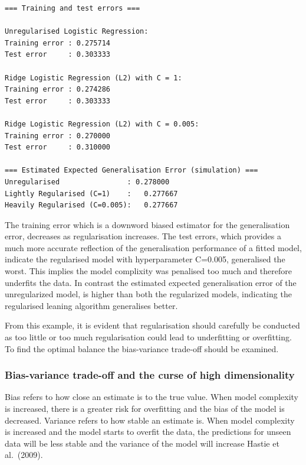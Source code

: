 \documentclass[11pt]{article}
\begin{document}
    \begin{Verbatim}[commandchars=\\\{\}]
=== Training and test errors ===

Unregularised Logistic Regression:
Training error : 0.275714
Test error     : 0.303333

Ridge Logistic Regression (L2) with C = 1:
Training error : 0.274286
Test error     : 0.303333

Ridge Logistic Regression (L2) with C = 0.005:
Training error : 0.270000
Test error     : 0.310000

=== Estimated Expected Generalisation Error (simulation) ===
Unregularised                : 0.278000
Lightly Regularised (C=1)    :   0.277667
Heavily Regularised (C=0.005):   0.277667
    \end{Verbatim}

    The training error which is a downword biased estimator for the
generalisation error, decreases as regularisation increases. The test
errors, which provides a much more accurate reflection of the
generalisation performance of a fitted model, indicate the regularised
model with hyperparameter C=0.005, generalised the worst. This implies
the model complixity was penalised too much and therefore underfits the
data. In contrast the estimated expected generalisation error of the
unregularized model, is higher than both the regularized models,
indicating the regularised leaning algorithm generalises better.

From this example, it is evident that regularisation should carefully be
conducted as too little or too much regularisation could lead to
underfitting or overfitting. To find the optimal balance the
bias-variance trade-off should be examined.

    \subsubsection{Bias-variance trade-off and the curse of high
dimensionality}\label{bias-variance-trade-off-and-the-curse-of-high-dimensionality}

Bias refers to how close an estimate is to the true value. When model
complexity is increased, there is a greater risk for overfitting and the
bias of the model is decreased. Variance refers to how stable an
estimate is. When model complexity is increased and the model starts to
overfit the data, the predictions for unseen data will be less stable
and the variance of the model will increase Hastie et al.~(2009).
\end{document}
